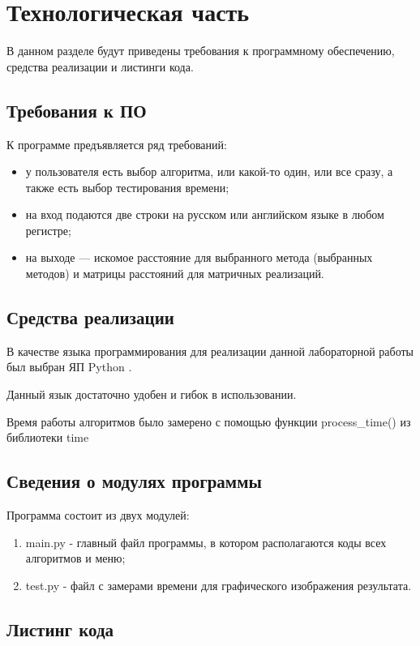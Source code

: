 \chapter{Технологическая часть}

В данном разделе будут приведены требования к программному обеспечению, средства реализации и листинги кода.

\section{Требования к ПО}

К программе предъявляется ряд требований:
\begin{itemize}
	\item у пользователя есть выбор алгоритма, или какой-то один, или все сразу, а также есть выбор тестирования времени;
	\item на вход подаются две строки на русском или английском языке в любом регистре;
	\item на выходе — искомое расстояние для выбранного метода (выбранных методов) и матрицы расстояний для матричных реализаций.
\end{itemize}

\section{Средства реализации}

В качестве языка программирования для реализации данной лабораторной работы был выбран ЯП Python \cite{pythonlang}. 

Данный язык достаточно удобен и гибок в использовании. 

Время работы алгоритмов было замерено с помощью функции process\_time() из библиотеки time \cite{pythonlangtime}

\section{Сведения о модулях программы}
Программа состоит из двух модулей:
\begin{enumerate}
	\item main.py - главный файл программы, в котором располагаются коды всех алгоритмов и меню;
	\item test.py - файл с замерами времени для графического изображения результата.
\end{enumerate}


\section{Листинг кода}

